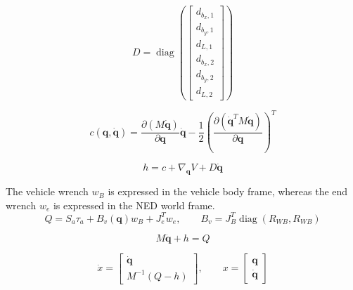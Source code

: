 \documentclass[11pt]{article}
\begin{document}
\begin{equation}
D=\operatorname{diag}\!\left(\begin{bmatrix}d_{b_x,1}\\d_{b_y,1}\\d_{L,1}\\d_{b_x,2}\\d_{b_y,2}\\d_{L,2}\end{bmatrix}\right)
\end{equation}

\begin{equation}
c(\boldsymbol q,\dot{\boldsymbol q})=\frac{\partial(M\dot{\boldsymbol q})}{\partial\boldsymbol q}\dot{\boldsymbol q}-\frac12\left(\frac{\partial(\dot{\boldsymbol q}^{T}M\dot{\boldsymbol q})}{\partial\boldsymbol q}\right)^T
\end{equation}

\begin{equation}
h=c+\nabla_{\boldsymbol q}V+D\dot{\boldsymbol q}
\end{equation}

The vehicle wrench $w_B$ is expressed in the vehicle body frame, whereas the end wrench $w_e$ is expressed in the NED world frame.
\begin{equation}
Q=S_a\tau_a+B_v(\boldsymbol q)w_B+J_e^Tw_e,\qquad B_v=J_B^T\operatorname{diag}(R_{WB},R_{WB})
\end{equation}

\begin{equation}
M\ddot{\boldsymbol q}+h=Q\label{eq:dynamics}
\end{equation}

\begin{equation}
\dot x=\begin{bmatrix}\dot{\boldsymbol q}\\M^{-1}(Q-h)\end{bmatrix},\qquad x=\begin{bmatrix}\boldsymbol q\\\dot{\boldsymbol q}\end{bmatrix}
\end{equation}
\end{document}
